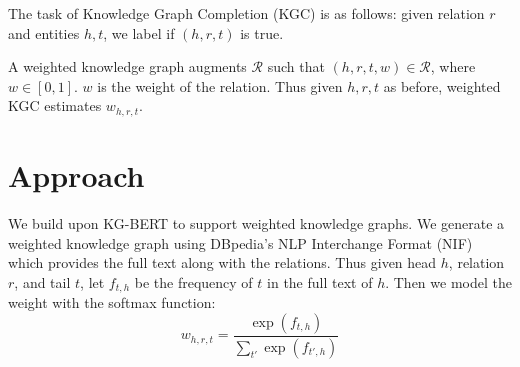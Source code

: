 \documentclass{article}
\begin{document}
The task of Knowledge Graph Completion (KGC) is as follows: given relation $r$ and entities $h, t$, we label if $(h,r,t)$ is true.

A weighted knowledge graph augments $\mathcal{R}$ such that $(h,r,t,w) \in \mathcal{R}$, where $w \in [0,1]$. $w$ is the weight of the relation. Thus given $h,r,t$ as before, weighted KGC estimates $w_{h,r,t}$.

\section{Approach}
We build upon KG-BERT\cite{https://doi.org/10.48550/arxiv.1909.03193} to support weighted knowledge graphs. We generate a weighted knowledge graph using DBpedia's NLP Interchange Format (NIF)\cite{DBLP:journals/corr/abs-1812-10315} which provides the full text along with the relations. Thus given head $h$, relation $r$, and tail $t$, let $f_{t,h}$ be the frequency of $t$ in the full text of $h$. Then we model the weight with the softmax function:
\begin{equation}
  w_{h,r,t} = \frac{\exp(f_{t,h})}{\sum_{t'} \exp(f_{t',h})}
\end{equation}
\end{document}
